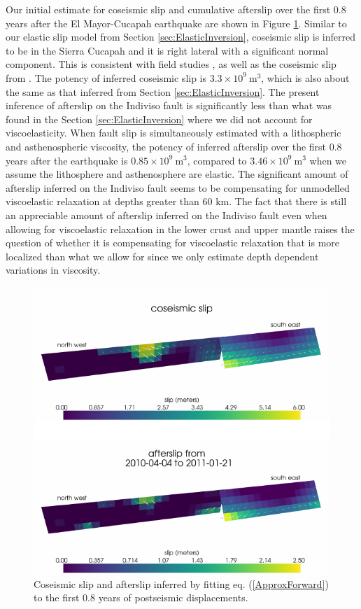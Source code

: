 \documentclass[review]{elsarticle}
\begin{document}
Our initial estimate for coseismic slip and cumulative afterslip over the first 0.8 years after the El Mayor-Cucapah earthquake are shown in Figure \ref{fig:InitialSlip}.  Similar to our elastic slip model from Section \ref{sec:ElasticInversion}, coseismic slip is inferred to be in the Sierra Cucapah and it is right lateral with a significant normal component.  This is consistent with field studies \citep{Fletcher2014}, as well as the coseismic slip from \citet{Wei2011}. The potency of inferred coseismic slip is $3.3\times 10^{9}\ \mathrm{m}^3$, which is also about the same as that inferred from Section \ref{sec:ElasticInversion}. The present inference of afterslip on the Indiviso fault is significantly less than what was found in the Section \ref{sec:ElasticInversion} where we did not account for viscoelasticity. When fault slip is simultaneously estimated with a lithospheric and asthenospheric viscosity, the potency of inferred afterslip over the first 0.8 years after the earthquake is $0.85\times 10^9\ \mathrm{m}^3$, compared to $3.46\times10^{9}\ \mathrm{m}^3$ when we assume the lithosphere and asthenosphere are elastic.  The significant amount of afterslip inferred on the Indiviso fault seems to be compensating for unmodelled viscoelastic relaxation at depths greater than $60$ km.  The fact that there is still an appreciable amount of afterslip inferred on the Indiviso fault even when allowing for viscoelastic relaxation in the lower crust and upper mantle raises the question of whether it is compensating for viscoelastic relaxation that is more localized than what we allow for since we only estimate depth dependent variations in viscosity.  

\begin{figure}
\includegraphics[scale=0.7]{Figures/InitialSlip}
\caption{Coseismic slip and afterslip inferred by fitting eq. (\ref{ApproxForward}) to the first 0.8 years of postseismic displacements.}
\label{fig:InitialSlip}
\end{figure} 
\end{document}
